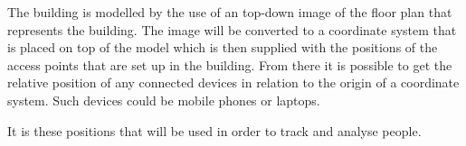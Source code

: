 The building is modelled by the use of an top-down image of the floor plan that represents the building. The image will be converted to a coordinate system that is placed on top of the model which is then supplied with the positions of the access points that are set up in the building. From there it is possible to get the relative position of any connected devices in relation to the origin of a coordinate system. Such devices could be mobile phones or laptops. 

It is these positions that will be used in order to track and analyse people.
